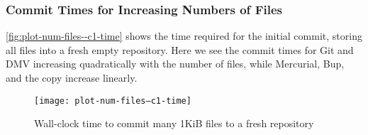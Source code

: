%


\subsubsection{Commit Times for Increasing Numbers of Files}

\autoref{fig:plot-num-files--c1-time} shows the time required for the initial \gls{commit}, storing all files into a fresh empty \gls{repository}.
Here we see the commit times for Git and DMV increasing quadratically with the number of files, while Mercurial, Bup, and the copy increase linearly.

\begin{figure}[]
    \caption{Wall-clock time to commit many 1KiB files to a fresh repository}
    \label{fig:plot-num-files--c1-time}
    \centering
    \texttt{[image: plot-num-files--c1-time]}
\end{figure}
